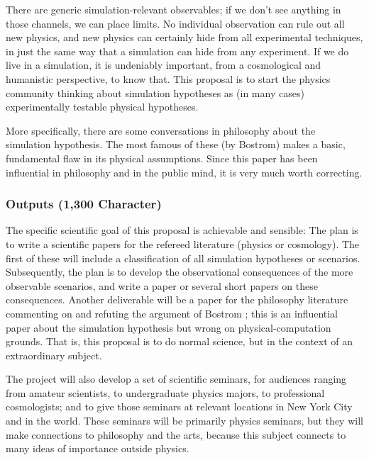 \documentclass[12pt]{article}
\begin{document}
There are generic simulation-relevant observables; if we don't see anything in those channels, we can place limits.
No individual observation can rule out all new physics, and new physics can certainly hide from all experimental techniques, in just the same way that a simulation can hide from any experiment.
If we do live in a simulation, it is undeniably important, from a cosmological and humanistic perspective, to know that.
This proposal is to start the physics community thinking about simulation hypotheses as (in many cases) experimentally testable physical hypotheses.

More specifically, there are some conversations in philosophy about the simulation hypothesis.
The most famous of these (by Bostrom) makes a basic, fundamental flaw in its physical assumptions.
Since this paper has been influential in philosophy and in the public mind, it is very much worth correcting.

\subsubsection*{Outputs (1,300 Character)}
The specific scientific goal of this proposal is achievable and sensible:
The plan is to write a scientific papers for the refereed literature (physics or cosmology).
The first of these will include a classification of all simulation hypotheses or scenarios.
Subsequently, the plan is to develop the observational consequences of the more observable scenarios, and write a paper or several short papers on these consequences.
Another deliverable will be a paper for the philosophy literature commenting on and refuting the argument of Bostrom \cite{bostrom}; this is an influential paper about the simulation hypothesis but wrong on physical-computation grounds.
That is, this proposal is to do normal science, but in the context of an extraordinary subject.

The project will also develop a set of scientific seminars, for audiences ranging from amateur scientists, to undergraduate physics majors, to professional cosmologists; and to give those seminars at relevant locations in New York City and in the world.
These seminars will be primarily physics seminars, but they will make connections to philosophy and the arts, because this subject connects to many ideas of importance outside physics.
\end{document}
